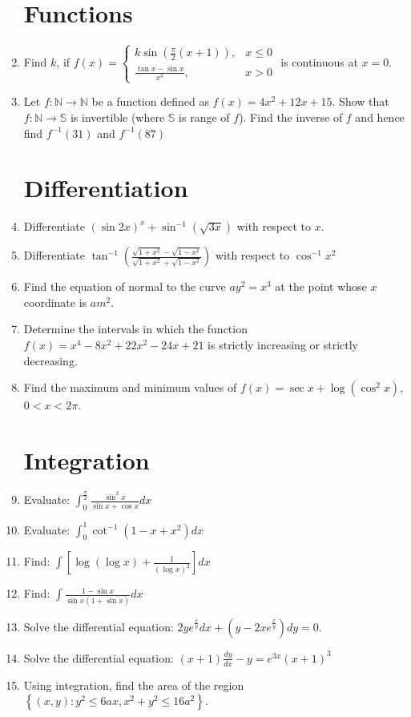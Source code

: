 \documentclass[10pt,-letter paper]{article}
\providecommand{\cbrak}[1]{\ensuremath{\left\{#1\right\}}}
\providecommand{\brak}[1]{\ensuremath{\left(#1\right)}}
\begin{document}
\begin{enumerate}
\section{Functions}
\item Find $k$, if $f(x) = 
    \begin{cases} 
        k \sin \brak{\frac{\pi}{2}\brak{x+1}},& x \leq 0 \\ 
        \frac{\tan x - \sin x}{x^3},& x > 0 
    \end{cases}$ is continuous at $x = 0$.
\item Let $f : \mathbb{N} \xrightarrow{} \mathbb{N}$ be a function defined as $f(x) = 4x^2 + 12x + 15$. Show that $f : \mathbb{N} \xrightarrow{} \mathbb{S}$ is invertible (where $\mathbb{S}$ is range of $f$). Find the inverse of $f$ and hence find $f^{-1}(31)$ and $f^{-1}(87)$
\section{Differentiation}
\item Differentiate $\brak{\sin 2x}^x + \sin^{-1}\brak{\sqrt{3x}}$ with respect to $x$.
\item Differentiate $\tan^{-1}\brak{\frac{\sqrt{1 + x^2} - \sqrt{1 - x^2}}{\sqrt{1 + x^2} + \sqrt{1 - x^2}}}$ with respect to $\cos^{-1}x^2$
\item Find the equation of normal to the curve $ay^2 = x^3$ at the point whose $x$ coordinate is $am^2$.
\item Determine the intervals in which the function $f(x) = x^4 - 8x^2 + 22x^2 - 24x +21$ is strictly increasing or strictly decreasing.
\item Find the maximum and minimum values of $f(x) = \sec x + \log\brak{\cos^2 x}$, $0 < x < 2\pi$.
\section{Integration}
\item Evaluate: $\int_0^\frac{\pi}{2} \frac{\sin^2x}{\sin x + \cos x} dx$
\item Evaluate: $\int_0^1 \cot^{-1}\brak{1 - x + x^2} dx$
\item Find: $\int [\log\brak{\log x} + \frac{1}{(\log x)^2}] dx$
\item Find: $\int \frac{1 - \sin x}{\sin x (1 + \sin x)}dx$
\item Solve the differential equation: $2y e^{\frac{x}{y}}dx + \brak{y - 2xe^{\frac{x}{y}}}dy = 0$.
\item Solve the differential equation: $(x + 1) \frac{dy}{dx} - y = e^{3x}(x + 1)^3$
\item Using integration, find the area of the region $\cbrak{\brak{x,y} : y^2 \leq 6ax, x^2 + y^2 \leq 16a^2}$.

\end{enumerate}
\end{document}
